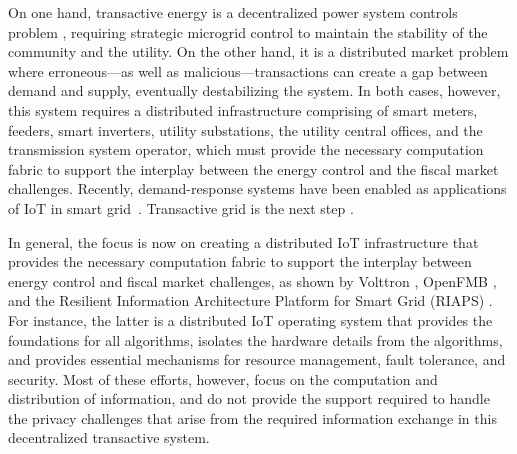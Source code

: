 On one hand, transactive energy is a decentralized power system
controls problem \cite{7452738}, requiring strategic microgrid control
to maintain the stability of the community and the utility. On the
other hand, it is a distributed market problem where erroneous---as
well as malicious---transactions can create a gap between demand and
supply, eventually destabilizing the system. In both cases, however,
this system requires a distributed infrastructure comprising of smart
meters, feeders, smart inverters, utility substations, the utility
central offices, and the transmission system operator, which must
provide the necessary computation fabric to support the interplay
between the energy control and the fiscal market challenges.
Recently, demand-response systems have been enabled as applications of
IoT in smart grid~\cite{Haider2016166}. Transactive grid is the next step \cite{collier2017emerging}.

In general, the focus is now on creating a distributed IoT
infrastructure
that provides the necessary computation fabric to support the
interplay between energy control and fiscal market challenges, as
shown by Volttron \cite{katipamula2016volttron}, OpenFMB
\cite{gunthersmart}, and the Resilient Information Architecture
Platform for Smart Grid (RIAPS)
\cite{eisele2017riaps,Scott2017ICCPS}. For instance, the latter is a
distributed IoT operating system that provides the foundations for all
algorithms, isolates the hardware details from the algorithms, and
provides essential mechanisms for resource management, fault
tolerance, and security. Most of these efforts, however, focus on the
computation and distribution of information, and do not provide the
support required to handle the privacy challenges that arise from the
required information exchange in this decentralized transactive
system.

